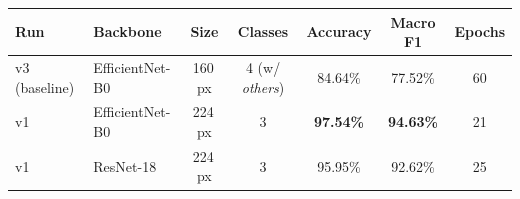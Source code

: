 \begin{tabular}{@{}llccccc@{}}
\toprule
\textbf{Run} & \textbf{Backbone} & \textbf{Size} & \textbf{Classes} & \textbf{Accuracy} & \textbf{Macro F1} & \textbf{Epochs} \\
\midrule
v3 (baseline) & EfficientNet-B0 & 160\,px & 4 (w/ \textit{others}) & 84.64\% & 77.52\% & 60       \\
v1            & EfficientNet-B0 & 224\,px & 3                       & \textbf{97.54\%} & \textbf{94.63\%} & 21 \\
v1            & ResNet-18       & 224\,px & 3                       & 95.95\%          & 92.62\%          & 25 \\
\bottomrule
\end{tabular}
